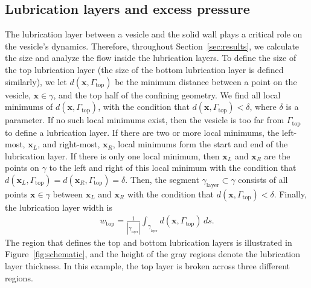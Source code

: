 \documentclass[twoside,twocolumn,9pt]{article}
\newcommand{\xx}{\mathbf{x}}
\newcommand{\yy}{\mathbf{y}}
\begin{document}
\subsection{\label{sec:LL} Lubrication layers and excess pressure}
The lubrication layer between a vesicle and the solid wall plays a
critical role on the vesicle's dynamics. Therefore, throughout
Section~\ref{sec:results}, we calculate the size and analyze the flow
inside the lubrication layers. 
%
To define the size of the top lubrication layer (the size of the bottom
lubrication layer is defined similarly), we let
$d(\xx,\Gamma_\mathrm{top})$ be the minimum distance between a point on
the vesicle, $\xx \in \gamma$, and the top half of the confining
geometry.
We find all local minimums of $d(\xx,\Gamma_\mathrm{top})$, with
the condition that $d(\xx,\Gamma_\mathrm{top}) < \delta$, where $\delta$
is a parameter. If no such local minimums exist, then the vesicle is too
far from $\Gamma_\mathrm{top}$ to define a lubrication layer. If there
are two or more local minimums, the left-most, $\xx_L$, and right-most,
$\xx_R$, local minimums form the start and end of the lubrication layer.
If there is only one local minimum, then $\xx_L$ and $\xx_R$ are the
points on $\gamma$ to the left and right of this local minimum with the
condition that $d(\xx_L,\Gamma_\mathrm{top}) =
d(\xx_R,\Gamma_\mathrm{top}) = \delta$. Then, the segment
$\gamma_{\mathrm{layer}} \subset \gamma$ consists of all points $\xx \in
\gamma$ between $\xx_L$ and $\xx_R$ with the condition that
$d(\xx,\Gamma_\mathrm{top}) < \delta$. Finally, the lubrication layer
width is
\begin{align}
  w_\mathrm{top} = \frac{1}{|\gamma_{_\mathrm{layer}}|} 
    \int_{\gamma_{_\mathrm{layer}}} d(\xx,\Gamma_\mathrm{top}) \, ds.
\end{align}
The region that defines the top and bottom lubrication layers is
illustrated in Figure~\ref{fig:schematic}, and the height of the gray
regions denote the lubrication layer thickness. In this example, the top
layer is broken across three different regions.
\end{document}
